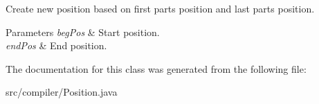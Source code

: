 Create new position based on first part\textquotesingle{}s position and last part\textquotesingle{}s position.


\begin{DoxyParams}{Parameters}
{\em beg\+Pos} & Start position. \\
\hline
{\em end\+Pos} & End position. \\
\hline
\end{DoxyParams}


The documentation for this class was generated from the following file\+:\begin{DoxyCompactItemize}
\item 
src/compiler/Position.\+java\end{DoxyCompactItemize}
